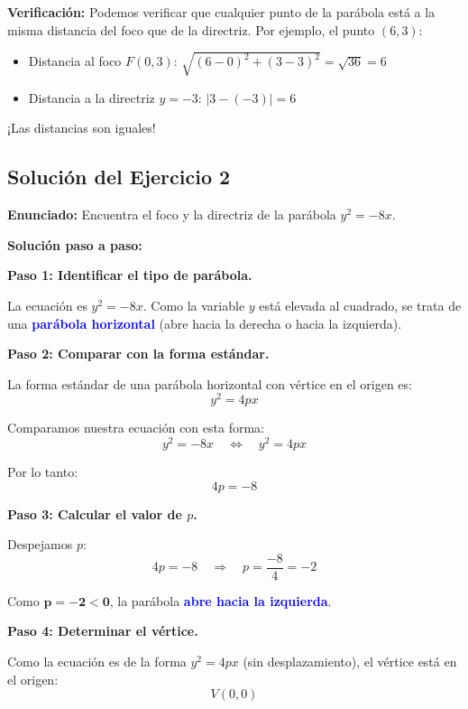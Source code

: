 \documentclass[12pt,a4paper]{article}
\begin{document}
	\bigskip

	\textbf{Verificación:} Podemos verificar que cualquier punto de la parábola está a la misma distancia del foco que de la directriz. Por ejemplo, el punto \((6,3)\):
	\begin{itemize}
		\item Distancia al foco \(F(0,3)\): \(\sqrt{(6-0)^2+(3-3)^2}=\sqrt{36}=6\)
		\item Distancia a la directriz \(y=-3\): \(|3-(-3)|=6\)
	\end{itemize}
	¡Las distancias son iguales!


	\subsection*{Solución del Ejercicio 2}

	\textbf{Enunciado:} Encuentra el foco y la directriz de la parábola \(y^2=-8x\).

	\bigskip

	\textbf{Solución paso a paso:}

	\bigskip

	\textbf{Paso 1: Identificar el tipo de parábola.}

	La ecuación es \(y^2=-8x\). Como la variable \(y\) está elevada al cuadrado, se trata de una \textcolor{blue}{\textbf{parábola horizontal}} (abre hacia la derecha o hacia la izquierda).

	\bigskip

	\textbf{Paso 2: Comparar con la forma estándar.}

	La forma estándar de una parábola horizontal con vértice en el origen es:
	\[
	y^2=4px
	\]

	Comparamos nuestra ecuación con esta forma:
	\[
	y^2=-8x \quad\Leftrightarrow\quad y^2=4px
	\]

	Por lo tanto:
	\[
	4p=-8
	\]

	\textbf{Paso 3: Calcular el valor de \(p\).}

	Despejamos \(p\):
	\[
	4p=-8 \quad\Rightarrow\quad p=\frac{-8}{4}=-2
	\]

	Como \(\mathbf{p=-2<0}\), la parábola \textcolor{blue}{\textbf{abre hacia la izquierda}}.

	\bigskip

	\textbf{Paso 4: Determinar el vértice.}

	Como la ecuación es de la forma \(y^2=4px\) (sin desplazamiento), el vértice está en el origen:
	\[
	\boxed{V(0,0)}
	\]
\end{document}
